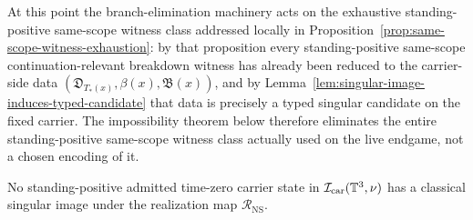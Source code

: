 At this point the branch-elimination machinery acts on the exhaustive standing-positive same-scope witness class addressed locally in Proposition~\ref{prop:same-scope-witness-exhaustion}: by that proposition every standing-positive same-scope continuation-relevant breakdown witness has already been reduced to the carrier-side data $(\mathfrak D_{T_*(x)},\beta(x),\mathfrak B(x))$, and by Lemma~\ref{lem:singular-image-induces-typed-candidate} that data is precisely a typed singular candidate on the fixed carrier. The impossibility theorem below therefore eliminates the entire standing-positive same-scope witness class actually used on the live endgame, not a chosen encoding of it.

\begin{theorem}\label{thm:no-singular-image-certified-interior}
No standing-positive admitted time-zero carrier state in
$\mathcal I_{\mathrm{car}}(\mathbb{T}^3,\nu)$ has a classical singular image under the realization map
$\mathcal R_{\mathrm{NS}}$.
\end{theorem}

